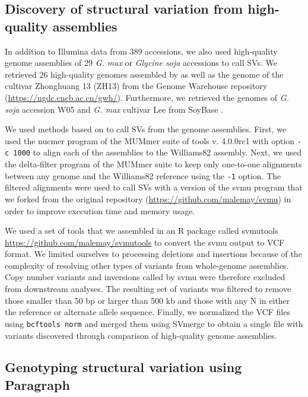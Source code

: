 \subsection*{Discovery of structural variation from high-quality assemblies}
\label{sv-gwas-sv-discovery-assembly}

In addition to Illumina data from 389 accessions, we also used
high-quality genome assemblies of 29 \emph{G. max} or \emph{Glycine soja}
accessions to call SVs. We
retrieved 26 high-quality genomes assembled by \cite{liu2020-pangenome} as well
as the genome of the cultivar Zhonghuang 13 (ZH13) from the Genome Warehouse
repository (\url{https://ngdc.cncb.ac.cn/gwh/}). Furthermore, we retrieved the genomes
of \emph{G. soja} accession W05 and \emph{G. max} cultivar Lee from SoyBase
\citep{grant2010}.

We used methods based on \cite{liu2020-pangenome} to call SVs from the
genome assemblies.  First, we used the nucmer program of the MUMmer suite of
tools v. 4.0.0rc1 \citep{marcais2018} with option \texttt{-c 1000} to align
each of the assemblies to the Williams82 assembly. Next, we used the
delta-filter program of the MUMmer suite to keep only one-to-one alignments
between any genome and the Williams82 reference using the \texttt{-1} option.
The filtered alignments were used to call SVs with a version of the svmu
program \citep{chakraborty2019} that we forked from the original repository
(\url{https://github.com/malemay/svmu}) in order to improve execution time and
memory usage.

We used a set of tools that we assembled in an R package called svmutools
\url{https://github.com/malemay/svmutools} to convert the svmu output to VCF
format. We limited ourselves to processing deletions and insertions because of
the complexity of resolving other types of variants from whole-genome
assemblies.  Copy number variants and inversions called by svmu were therefore
excluded from downstream analyses. The
resulting set of variants was filtered to remove those smaller than 50 bp or larger than 500
kb and those with any N in either the reference or alternate allele sequence.
Finally, we normalized the VCF files using \texttt{bcftools norm} and merged
them using SVmerge to obtain a single file with variants discovered through
comparison of high-quality genome assemblies.

\subsection*{Genotyping structural variation using Paragraph}
\label{sv-gwas-sv-genotyping-paragraph}

